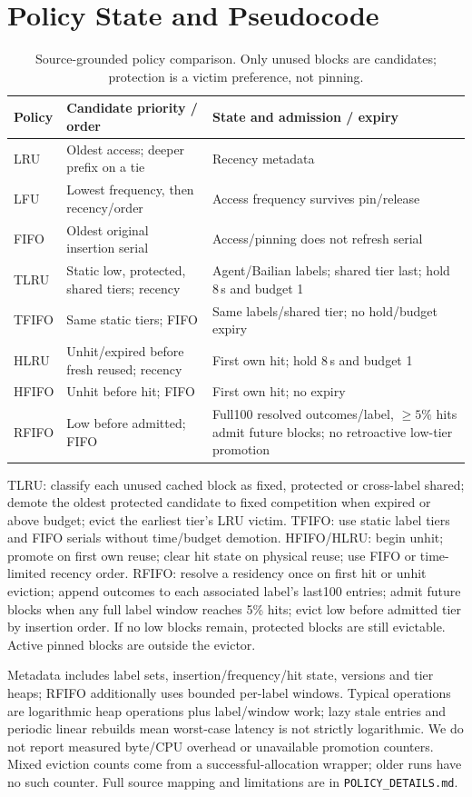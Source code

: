 \documentclass{article}
\begin{document}
\section{Policy State and Pseudocode}
\begin{table}[t]\centering\small
\caption{Source-grounded policy comparison. Only unused blocks are candidates; protection is a victim preference, not pinning.}
\begin{tabular}{lp{}p{}}\toprule
Policy & Candidate priority / order & State and admission / expiry\\\midrule
LRU & Oldest access; deeper prefix on a tie & Recency metadata\\
LFU & Lowest frequency, then recency/order & Access frequency survives pin/release\\
FIFO & Oldest original insertion serial & Access/pinning does not refresh serial\\
TLRU & Static low, protected, shared tiers; recency & Agent/Bailian labels; shared tier last; hold 8\,s and budget 1\\
TFIFO & Same static tiers; FIFO & Same labels/shared tier; no hold/budget expiry\\
HLRU & Unhit/expired before fresh reused; recency & First own hit; hold 8\,s and budget 1\\
HFIFO & Unhit before hit; FIFO & First own hit; no expiry\\
RFIFO & Low before admitted; FIFO & Full100 resolved outcomes/label, $\ge5\%$ hits admit future blocks; no retroactive low-tier promotion\\\bottomrule
\end{tabular}\end{table}
TLRU: classify each unused cached block as fixed, protected or cross-label shared; demote the oldest protected candidate to fixed competition when expired or above budget; evict the earliest tier's LRU victim. TFIFO: use static label tiers and FIFO serials without time/budget demotion. HFIFO/HLRU: begin unhit; promote on first own reuse; clear hit state on physical reuse; use FIFO or time-limited recency order. RFIFO: resolve a residency once on first hit or unhit eviction; append outcomes to each associated label's last100 entries; admit future blocks when any full label window reaches 5\% hits; evict low before admitted tier by insertion order. If no low blocks remain, protected blocks are still evictable. Active pinned blocks are outside the evictor.

Metadata includes label sets, insertion/frequency/hit state, versions and tier heaps; RFIFO additionally uses bounded per-label windows. Typical operations are logarithmic heap operations plus label/window work; lazy stale entries and periodic linear rebuilds mean worst-case latency is not strictly logarithmic. We do not report measured byte/CPU overhead or unavailable promotion counters. Mixed eviction counts come from a successful-allocation wrapper; older runs have no such counter. Full source mapping and limitations are in \texttt{POLICY\_DETAILS.md}.
\end{document}
